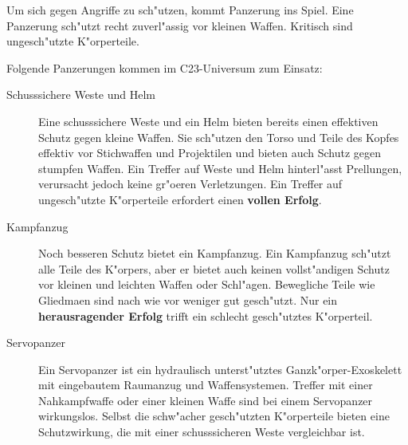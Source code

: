 Um sich gegen Angriffe zu sch"utzen, kommt Panzerung ins Spiel. Eine Panzerung sch"utzt recht zuverl"assig vor kleinen Waffen. Kritisch sind ungesch"utzte K"orperteile.

Folgende Panzerungen kommen im C23-Universum zum Einsatz:

\begin{description}
    \item[Schusssichere Weste und Helm] Eine schusssichere Weste und ein Helm bieten bereits einen effektiven Schutz gegen kleine Waffen. Sie sch"utzen den Torso und Teile des Kopfes effektiv vor Stichwaffen und Projektilen und bieten auch Schutz gegen stumpfen Waffen. Ein Treffer auf Weste und Helm hinterl"asst Prellungen, verursacht jedoch keine gr"o\3eren Verletzungen. Ein Treffer auf ungesch"utzte K"orperteile erfordert einen \textbf{vollen Erfolg}.
    \item[Kampfanzug] Noch besseren Schutz bietet ein Kampfanzug. Ein Kampfanzug sch"utzt alle Teile des K"orpers, aber er bietet auch     
        keinen vollst"andigen Schutz vor kleinen und leichten Waffen oder Schl"agen. Bewegliche Teile wie Gliedma\3en sind nach wie vor weniger gut gesch"utzt. Nur ein \textbf{herausragender Erfolg} trifft ein schlecht gesch"utztes K"orperteil.
    \item[Servopanzer] Ein Servopanzer ist ein hydraulisch unterst"utztes Ganzk"orper-Exoskelett mit eingebautem Raumanzug und 
        Waffensystemen. Treffer mit einer Nahkampfwaffe oder einer kleinen Waffe sind bei einem Servopanzer wirkungslos. Selbst die schw"acher gesch"utzten K"orperteile bieten eine Schutzwirkung, die mit einer schusssicheren Weste vergleichbar ist.
\end{description}

